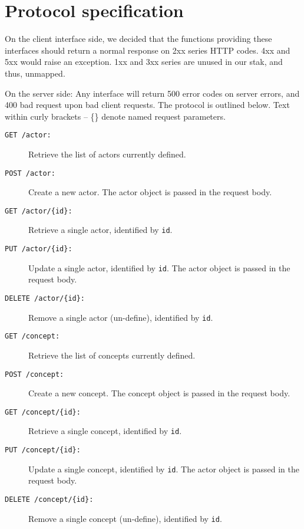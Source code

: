 \chapter{Protocol specification}
\label{appendix:protocol}
On the client interface side, we decided that the functions providing these interfaces should return a normal response on 2xx series HTTP codes. 4xx and 5xx would raise an exception. 1xx and 3xx series are unused in our stak, and thus, unmapped.\medskip

\noindent On the server side: Any interface will return 500 error codes on server errors, and 400 bad request upon bad client requests. The protocol is outlined below. Text within curly brackets -- \{\} denote named request parameters.
\begin{description}

  \item[\texttt{GET /actor:}] Retrieve the list of actors currently defined.

  \item[\texttt{POST /actor:}] Create a new actor. The actor object is passed in the request body.

  \item[\texttt{GET /actor/\{id\}:}] Retrieve a single actor, identified by \texttt{id}.

  \item[\texttt{PUT /actor/\{id\}:}] Update a single actor, identified by \texttt{id}. The actor object is passed in the request body.

  \item[\texttt{DELETE /actor/\{id\}:}] Remove a single actor (un-define), identified by \texttt{id}.

  \item[\texttt{GET /concept:}] Retrieve the list of concepts currently defined.

  \item[\texttt{POST /concept:}] Create a new concept. The concept object is passed in the request body.

  \item[\texttt{GET /concept/\{id\}:}] Retrieve a single concept, identified by \texttt{id}.

  \item[\texttt{PUT /concept/\{id\}:}] Update a single concept, identified by \texttt{id}. The actor object is passed in the request body.

  \item[\texttt{DELETE /concept/\{id\}:}] Remove a single concept (un-define), identified by \texttt{id}.


\end{description}
